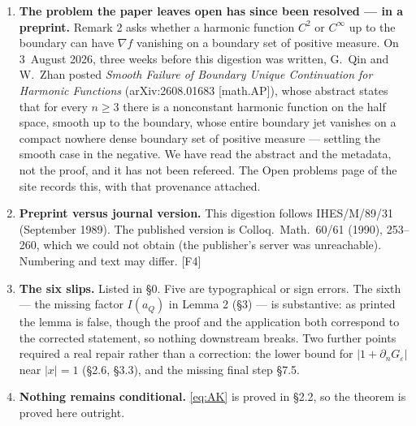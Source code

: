 \documentclass[11pt,reqno]{amsart}
\theoremstyle{plain}
\theoremstyle{definition}
\theoremstyle{plain}
\theoremstyle{definition}
\theoremstyle{remark}
\newcommand{\nd}{\partial_n}
\newcommand{\Ledger}[1]{{\scriptsize\textsf{[#1]}}}
\begin{document}
\begin{enumerate}[leftmargin=1.6em,itemsep=4pt]
\item \textbf{The problem the paper leaves open has since been resolved --- in a
  preprint.} Remark 2 asks whether a harmonic function $C^2$ or $C^\infty$ up to the
  boundary can have $\nabla f$ vanishing on a boundary set of positive measure. On
  3~August 2026, three weeks before this digestion was written, G.~Qin and W.~Zhan
  posted \emph{Smooth Failure of Boundary Unique Continuation for Harmonic
  Functions} (arXiv:2608.01683 [math.AP]), whose abstract states that for every
  $n\ge3$ there is a nonconstant harmonic function on the half space, smooth up to
  the boundary, whose entire boundary jet vanishes on a compact nowhere dense
  boundary set of positive measure --- settling the smooth case in the negative. We
  have read the abstract and the metadata, not the proof, and it has not been
  refereed. The Open problems page of the site records this, with that provenance
  attached.
\item \textbf{Preprint versus journal version.} This digestion follows
  IHES/M/89/31 (September 1989). The published version is Colloq.\ Math.\ 60/61
  (1990), 253--260, which we could not obtain (the publisher's server was
  unreachable). Numbering and text may differ. \Ledger{F4}
\item \textbf{The six slips.} Listed in \S0. Five are typographical or sign
  errors. The sixth --- the missing factor $I(a_Q)$ in Lemma 2 (\S3) --- is
  substantive: as printed the lemma is false, though the proof and the application
  both correspond to the corrected statement, so nothing downstream breaks. Two
  further points required a real repair rather than a correction: the lower bound
  for $|1+\nd G_\varepsilon|$ near $|x|=1$ (\S2.6, \S3.3), and the missing final
  step \S7.5.
\item \textbf{Nothing remains conditional.} \eqref{eq:AK} is proved in \S2.2, so
  the theorem is proved here outright.


\end{enumerate}
\end{document}
